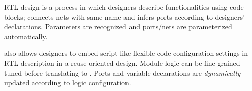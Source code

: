 \mhdl{} RTL design is a process in which designers describe functionalities 
using code blocks; \mhdlc{} connects nets with same name and infers
ports according to designers' declarations. Parameters are recognized
and ports/nets are parameterized automatically.

\mhdl{} also allows designers to embed script like flexible code configuration
settings in RTL description in a reuse oriented design. Module logic
can be fine-grained tuned before translating \mhdl{} to \sv{}. Ports
and variable declarations are \emph{dynamically} updated according to
logic configuration.
